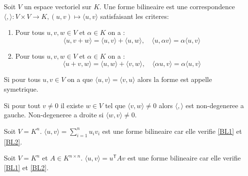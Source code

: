 \begin{definition}
Soit $V$ un espace vectoriel sur $K$. Une forme bilineaire est une correspondence $\langle , \rangle:V\times V\to K,(u,v)\mapsto \langle u,v \rangle$ satisfaisant les criteres:
\begin{enumerate}
\item \label{BL1} Pour tous $u,v,w\in V$ et $\alpha \in K$ on a : 
$$
\langle u,v+w \rangle =\langle u,v \rangle +\langle u,w \rangle ,\quad \langle u,\alpha v \rangle =\alpha \langle u,v \rangle
$$
\item \label{BL2} Pour tous $u,v,w\in V$ et $\alpha \in K$ on a :
$$
\langle u+v,w \rangle =\langle u,w \rangle +\langle v,w \rangle ,\quad \langle \alpha u,v \rangle =\alpha \langle u,v \rangle 
$$
\end{enumerate}
Si pour tous $u,v\in V$ on a que $\langle u,v \rangle=\langle v,u \rangle$ alors la forme est appelle symetrique.

Si pour tout $v\neq 0$ il existe $w\in V$ tel que $\langle v,w \rangle\neq 0$ alors $\langle , \rangle$ est non-degeneree a gauche. Non-degeneree a droite si $\langle w,v \rangle\neq 0$.
\end{definition}
\begin{example}
	Soit $V=K^{n}$. $\langle u,v\rangle=\sum_{i=1}^{n}u_{i}v_{i}$ est une forme bilineaire car elle verifie \ref{BL1} et \ref{BL2}.
\end{example}
\begin{example}
Soit $V=K^{n}$ et $A\in K^{n\times n}$. $\langle u,v \rangle=u^{\mathsf{T}}Av$  est une forme bilineaire car elle verifie \ref{BL1} et \ref{BL2}.
\end{example}

